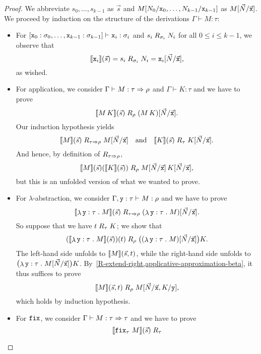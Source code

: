\begin{proof}
  We abbreviate \(s_0,\dots,s_{k-1}\) as \(\vec s\) and
  \(M[N_0/\var x_0,\dots,N_{k-1}/\var x_{k-1}]\) as
  \(M[\vec{N}/\vec{\var{x}}]\). We proceed by induction on the structure of the
  derivations \(\Gamma \vdash M : \tau\):

  \begin{itemize}
  \item For
    \([\var x_0 : \sigma_0,\dots,\var x_{k-1} : \sigma_{k-1}] \vdash \var x_i :
    \sigma_i\) and \(s_i \logrel_{\sigma_i} N_i\) for all
    \(0 \leq i \leq k-1\), we observe that
    \[ {\densem{\var x_i}(\vec s)} = {s_i} \logrel_{\sigma_i} {N_i} =
      {{\var x_i}[\vec N/\vec{\var{x}}]},
    \]
    as wished.
  \item For application, we consider \(\Gamma \vdash M : \tau \pcffun \rho\) and
    \(\Gamma \vdash K : \tau\) and we have to prove
    \[
      \densem{M \, K}(\vec s) \logrel_\rho \pa*{M \, K}[\vec N/\vec{\var x}].
    \]
    Our induction hypothesis yields
    \[
      \densem{M}(\vec s) \logrel_{\tau \pcffun \rho} M[\vec N/\vec{\var{x}}]
      \quad\text{and}\quad
      \densem{K}(\vec s) \logrel_\tau K[\vec N/\vec{\var x}].
    \]
    And hence, by definition of \(\logrel_{\tau \pcffun \rho}\),
    \[
      {\densem{M}(\vec s)\pa*{\densem{K}(\vec s)}} \logrel_\rho
      M[\vec N/\vec{\var x}] \, K[\vec N/\vec {\var x}],
    \]
    but this is an unfolded version of what we wanted to prove.
  \item For \(\lambda\)-abstraction, we consider
    \(\Gamma,\var y : \tau \vdash M : \rho\) and we have to prove
    \[
      \densem{\lambdadot{\var y : \tau}{M}}(\vec s) \logrel_{\tau \pcffun \rho}
      \pa*{\lambdadot{\var y: \tau}{M}}[\vec{N}/\vec{\var{x}}].
    \]
    So suppose that we have \(t \logrel_\tau K\); we show that
    \[
      \pa*{\densem{\lambdadot{\var y : \tau}{M}}(\vec s)}(t) \logrel_{\rho}
      \pa[\big]{\pa*{\lambdadot{\var y: \tau}{M}}[\vec{N}/\vec{\var{x}}]}K.
    \]
    The left-hand side unfolds to \(\densem{M}(\vec s,t)\), while the right-hand
    side unfolds to
    \(\pa[\big]{\lambdadot{\var y : \tau}{M[\vec{N}/\vec{\var{x}}]}}K\).
    By~\cref{R-extend-right,applicative-approximation-beta}, it thus suffices to
    prove
    \[
      \densem{M}(\vec s,t) \logrel_\rho M[\vec{N}/\vec{\var x},K/\var y],
    \]
    which holds by induction hypothesis.
  \item
    For \(\pcffix\), we consider \(\Gamma \vdash M : \tau \pcffun \tau\) and we have to prove
    \[
      \densem{\pcffix_\tau\,M}(\vec s) \logrel_\tau
\]
\end{itemize}
\end{proof}
